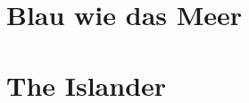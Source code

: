 \documentclass{article}
\begin{document}
    \tableofcontents

    \newpage

     \section{Blau wie das Meer}
     
    \newpage
    \section{The Islander}
    

    \newpage
\end{document}
